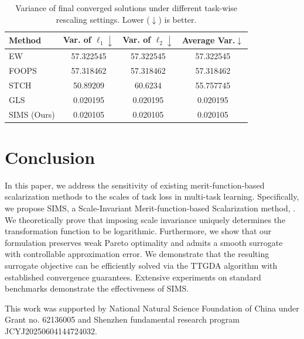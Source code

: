 \documentclass[sigconf]{acmart}
\begin{document}
\begin{table}[t]
\centering
\caption{Variance of final converged solutions under different task-wise rescaling settings. Lower ($\downarrow$) is better.}
\label{tab:variance_comparison}
\begin{tabular}{lccc}
\toprule
Method & Var. of $\ell_1\downarrow$ & Var. of $\ell_2\downarrow$ & Average Var.$\downarrow$ \\
\midrule
EW     & 57.322545 & 57.322545 & 57.322545 \\
FOOPS  & 57.318462 & 57.318462 & 57.318462 \\
STCH   & 50.89209  & 60.6234   & 55.757745 \\
GLS    & 0.020195  & 0.020195  & 0.020195 \\
SIMS (Ours)   & 0.020105  & 0.020105  & 0.020105 \\
\bottomrule
\end{tabular}
\vspace{-10pt}
\end{table}


\section{Conclusion}
In this paper, we address the sensitivity of existing merit-function-based scalarization methods to the scales of task loss in multi-task learning. Specifically, we propose SIMS, a Scale-Invariant Merit-function-based Scalarization method, . We theoretically prove that imposing scale invariance uniquely determines the transformation function to be logarithmic. Furthermore, we show that our formulation preserves weak Pareto optimality and admits a smooth surrogate with controllable approximation error. We demonstrate that the resulting surrogate objective can be efficiently solved via the TTGDA algorithm with established convergence guarantees. Extensive experiments on standard benchmarks demonstrate the effectiveness of SIMS. 

\begin{acks}
This work was supported by National Natural Science Foundation of China under Grant no. 62136005 and Shenzhen fundamental research program JCYJ20250604144724032.
\end{acks}
\end{document}
